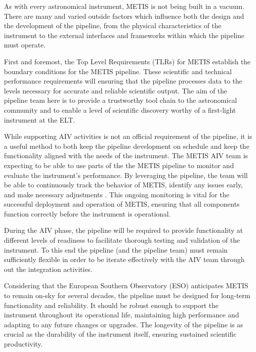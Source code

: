 \documentclass[a4paper]{spie}  %
\begin{document}
As with every astronomical instrument, METIS is not being built in a vacuum. 
There are many and varied outside factors which influence both the design and the development of the pipeline, from the physical characteristics of the instrument to the external interfaces and frameworks within which the pipeline must operate.

First and foremost, the Top Level Requirements (TLRs) for METIS \cite{ESO-257869} establish the boundary conditions for the METIS pipeline.
These scientific and technical performance requirements will ensuring that the pipeline processes data to the levels necessary for accurate and reliable scientific output. 
The aim of the pipeline team here is to provide a trustworthy tool chain to the astronomical community and to enable a level of scientific discovery worthy of a first-light instrument at the ELT. 

While supporting AIV activities is not an official requirement of the pipeline, it is a useful method to both keep the pipeline development on schedule and keep the functionality aligned with the needs of the instrument. 
The METIS AIV team is expecting to be able to use parts of the the METIS pipeline to monitor and evaluate the instrument's performance.
By leveraging the pipeline, the team will be able to continuously track the behavior of METIS, identify any issues early, and make necessary adjustments . 
This ongoing monitoring is vital for the successful deployment and operation of METIS, ensuring that all components function correctly before the instrument is operational.

During the AIV phase, the pipeline will be required to provide functionality at different levels of readiness to facilitate thorough testing and validation of the instrument. 
To this end the pipeline (and the pipeline team) must remain sufficiently flexible in order to be iterate effectively with the AIV team through out the integration activities.

Considering that the European Southern Observatory (ESO) anticipates METIS to remain on-sky for several decades, the pipeline must be designed for long-term functionality and reliability. 
It should be robust enough to support the instrument throughout its operational life, maintaining high performance and adapting to any future changes or upgrades. 
The longevity of the pipeline is as crucial as the durability of the instrument itself, ensuring sustained scientific productivity.
\end{document}
